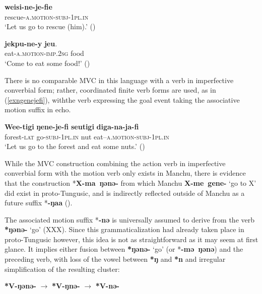 \documentclass{article}
\newcommand{\ipa}[1]{\textbf{{\phon\mbox{#1}}}} %
\begin{document}
\begin{exe}
\ex 
\gll \ipa{weisi-ne-je-fie} \\
rescue-\textsc{a.motion-subj-1pl.in} \\
\glt ‘Let us go to rescue (him).’ (\citealt[47]{nikolaeva01udihe})
\end{exe}

\begin{exe}
\ex 
\gll \ipa{jekpu-ne-y} \ipa{jeu}. \\
eat-\textsc{a.motion-imp.2sg} food \\
\glt ‘Come to eat some food!’ (\citealt[122]{nikolaeva01udihe})
\end{exe}

There is no comparable MVC in this language with a verb in imperfective converbial form; rather, coordinated finite verb forms are used, as in (\ref{exngenejefi}), withthe verb expressing the goal event taking the associative motion suffix in echo.

\begin{exe}
\ex \label{ex:ngenejefi}
\gll 
\ipa{Wee-tigi} 	\ipa{ŋene-je-fi} 	\ipa{seutigi} 	\ipa{diga-na-ja-fi} \\
forest-\textsc{lat} go-\textsc{subj-1pl.in} nut eat--\textsc{a.motion-subj-1pl.in} \\
\glt ‘Let us go to the forest and eat some nuts.’ (\citealt[121]{nikolaeva01udihe})
\end{exe}

While the MVC construction combining the action verb in imperfective converbial form with the motion verb only exists in Manchu, there is evidence that the construction *\ipa{X-ma ŋənə-} from which Manchu \ipa{X-me gene-} `go to X' did exist in proto-Tungusic, and is indirectly reflected outside of Manchu as a future suffix *\ipa{-ŋaa} (\citealt[64++]{fuente11tungusic}).

The associated motion suffix *\ipa{-nə} is universally assumed to derive from the verb \ipa{*ŋənə-} `go' (XXX). Since this grammaticalization had already taken place in proto-Tungusic however, this idea is not as straightforward as it may seem at first glance. It implies either fusion between \ipa{*ŋənə-} `go' (or *\ipa{-mə ŋənə}) and the preceding verb, with loss of the vowel between \ipa{*ŋ} and \ipa{*n} and irregular simplification of the resulting cluster:

\begin{exe}
\ex 
\glt \ipa{*V-ŋənə-} $\rightarrow $ \ipa{*V-ŋnə-} $\rightarrow $  \ipa{*V-nə-} 
\end{exe}  
\end{document}

